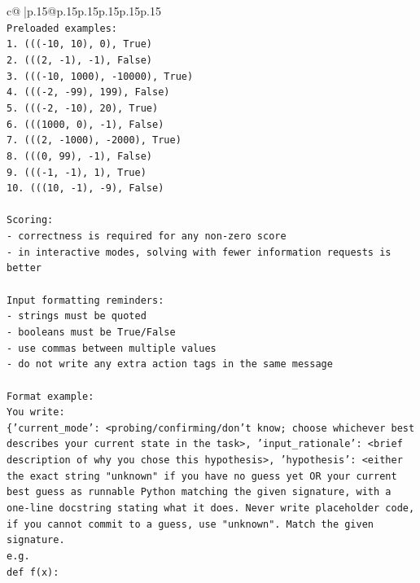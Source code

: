 \documentclass{article}
\begin{document}
{\begin{supertabular}{c@{$\;$}|p{.15\linewidth}@{}p{.15\linewidth}p{.15\linewidth}p{.15\linewidth}p{.15\linewidth}p{.15\linewidth}}
{{{\\ 
\texttt{Preloaded examples:} \\
\texttt{1. ((({-}10, 10), 0), True)} \\
\texttt{2. (((2, {-}1), {-}1), False)} \\
\texttt{3. ((({-}10, 1000), {-}10000), True)} \\
\texttt{4. ((({-}2, {-}99), 199), False)} \\
\texttt{5. ((({-}2, {-}10), 20), True)} \\
\texttt{6. (((1000, 0), {-}1), False)} \\
\texttt{7. (((2, {-}1000), {-}2000), True)} \\
\texttt{8. (((0, 99), {-}1), False)} \\
\texttt{9. ((({-}1, {-}1), 1), True)} \\
\texttt{10. (((10, {-}1), {-}9), False)} \\
\\ 
\texttt{Scoring:} \\
\texttt{{-} correctness is required for any non{-}zero score} \\
\texttt{{-} in interactive modes, solving with fewer information requests is better} \\
\\ 
\texttt{Input formatting reminders:} \\
\texttt{{-} strings must be quoted} \\
\texttt{{-} booleans must be True/False} \\
\texttt{{-} use commas between multiple values} \\
\texttt{{-} do not write any extra action tags in the same message} \\
\\ 
\texttt{Format example:} \\
\texttt{You write:} \\
\texttt{\{'current\_mode': <probing/confirming/don't know; choose whichever best describes your current state in the task>, 'input\_rationale': <brief description of why you chose this hypothesis>, 'hypothesis': <either the exact string "unknown" if you have no guess yet OR your current best guess as runnable Python matching the given signature, with a one{-}line docstring stating what it does. Never write placeholder code, if you cannot commit to a guess, use "unknown". Match the given signature.} \\
\texttt{e.g.} \\
\texttt{def f(x):} \\
}}}
\end{supertabular}}
\end{document}
